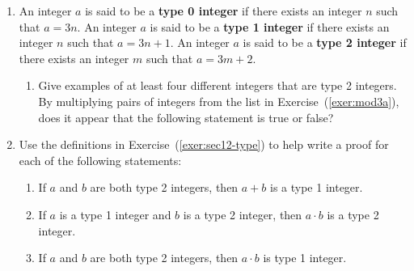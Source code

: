 \begin{enumerate}
\item \label{exer:sec12-type}%
An integer $a$ is said to be a \textbf{type 0 integer} if there exists an integer $n$ such that 
$a=3n$. An integer $a$ is said to be a \textbf{type 1 integer} if there exists an integer $n$ such that $a=3n+1$. An integer $a$ is said to be a \textbf{type 2 integer} if there exists an integer $m$ such that $a=3m+2$. 

\begin{enumerate}
    \yitem \label{exer:mod3a}%
         Give examples of at least four different integers that are type 1 integers. 

    \item Give examples of at least four different integers that are type 2 integers.
    \yitem By multiplying pairs of integers from the list in Exercise~(\ref{exer:mod3a}), does it appear that the following statement is true or false?  

\end{enumerate}


\item \label{exer:sec12-typeproof}%
Use the definitions in Exercise~(\ref{exer:sec12-type}) to help write a proof for each of the following statements: 
  \begin{enumerate}
    \yitem If $a$ and $b$ are both type 1 integers, then $ a + b$ is a type 2 integer.
    \item If $a$ and $b$ are both type 2 integers, then $ a + b$ is a type 1 integer.
    \item If $a$ is a type 1 integer and $b$ is a type 2 integer, then $ a \cdot b$ is a type 2 integer.
    \item If $a$ and $b$ are both type 2 integers, then $ a \cdot b$ is type 1 integer.
  \end{enumerate}


\end{enumerate}

